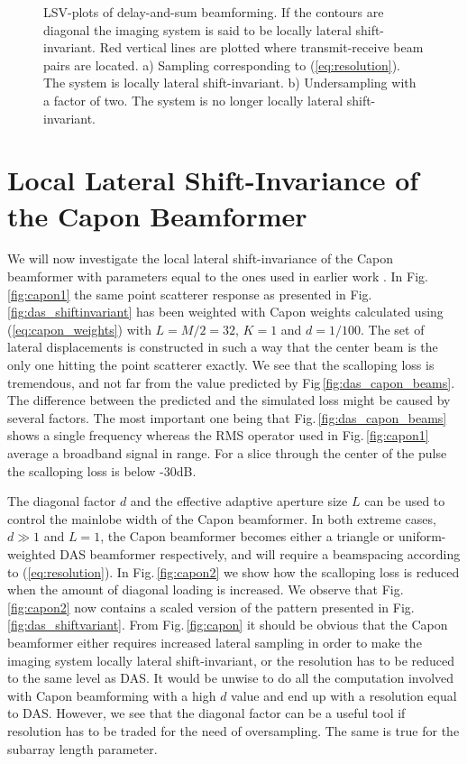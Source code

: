 \documentclass[journal]{IEEEtran}
\newcommand{\img}{img/}
\begin{document}
\begin{figure}[!t]
\centerline{
\hfill{}
}
\caption{LSV-plots of delay-and-sum beamforming. If the contours are diagonal the imaging system is said to be locally lateral shift-invariant. Red vertical lines are plotted where transmit-receive beam pairs are located. a) Sampling corresponding to (\ref{eq:resolution}). The system is locally lateral shift-invariant. b) Undersampling with a factor of two. The system is no longer locally lateral shift-invariant.}
\label{fig:das}
\end{figure}

\section{Local Lateral Shift-Invariance of the Capon Beamformer}\label{sec:capon_LLSI}
We will now investigate the local lateral shift-invariance of the Capon beamformer with parameters equal to the ones used in earlier work \cite{Synnevag2009, Asen}. In Fig.\,\ref{fig:capon1} the same point scatterer response as presented in Fig.\,\ref{fig:das_shiftinvariant} has been weighted with Capon weights calculated using (\ref{eq:capon_weights}) with $L = M/2 = 32$, $K=1$ and $d=1/100$. The set of lateral displacements is constructed in such a way that the center beam is the only one hitting the point scatterer exactly. We see that the scalloping loss is tremendous, and not far from the value predicted by Fig\,\ref{fig:das_capon_beams}. The difference between the predicted and the simulated loss might be caused by several factors. The most important one being that Fig.\,\ref{fig:das_capon_beams} shows a single frequency whereas the RMS operator used in Fig.\,\ref{fig:capon1} average a broadband signal in range. For a slice through the center of the pulse the scalloping loss is below -30dB.

The diagonal factor $d$ and the effective adaptive aperture size $L$ can be used to control the mainlobe width of the Capon beamformer. In both extreme cases, $d\gg1$ and $L=1$, the Capon beamformer becomes either a triangle or uniform-weighted DAS beamformer respectively, and will require a beamspacing according to (\ref{eq:resolution}). In Fig.\,\ref{fig:capon2} we show how the scalloping loss is reduced when the amount of diagonal loading is increased. We observe that Fig.\,\ref{fig:capon2} now contains a scaled version of the pattern presented in Fig.\,\ref{fig:das_shiftvariant}. From Fig.\,\ref{fig:capon} it should be obvious that the Capon beamformer either requires increased lateral sampling in order to make the imaging system locally lateral shift-invariant, or the resolution has to be reduced to the same level as DAS. It would be unwise to do all the computation involved with Capon beamforming with a high $d$ value and end up with a resolution equal to DAS. However, we see that the diagonal factor can be a useful tool if resolution has to be traded for the need of oversampling. The same is true for the subarray length parameter.
  
\end{document}
